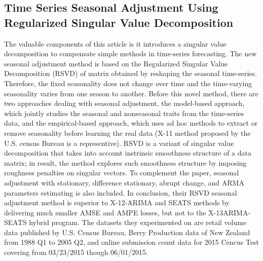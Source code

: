 \documentclass[12pt]{article}
\begin{document}
\subsection{Time Series Seasonal Adjustment Using Regularized Singular Value Decomposition}
The valuable components of this article is it introduces a singular value decomposition to compensate simple methods in time-series forecasting. The new seasonal adjustment method is based on the Regularized Singular Value Decomposition (RSVD) of matrix obtained by reshaping the seasonal time-series. Therefore, the fixed seasonality does not change over time and the time-varying seasonality varies from one season to another. Before this novel method, there are two approaches dealing with seasonal adjustment, the model-based approach, which jointly studies the seasonal and nonseasonal traits from the time-series data, and the empirical-based approach, which uses ad hoc methods to extract or remove seasonality before learning the real data (X-11 method proposed by the U.S. census Bureau is a representive). RSVD is a variant of singular value decomposition that takes into account instrinsic smoothness structure of a data matrix; in result, the method explores such smoothness structure by imposing roughness penalties on singular vectors. To complement the paper, seasonal adjustment with stationary, difference stationary, abrupt change, and ARMA parameters estimating is also included. In conclusion, their RSVD seasonal adjustment method is superior to X-12-ARIMA and SEATS methods by delivering much smaller AMSE and AMPE losses, but not to the X-13ARIMA-SEATS hybrid program. The datasets they experimented on are retail volume data published by U.S. Census Bureau, Berry Production data of New Zealand from 1988 Q1 to 2005 Q2, and online submission count data for 2015 Cencus Test covering from 03/23/2015 though 06/01/2015. 
\end{document}
